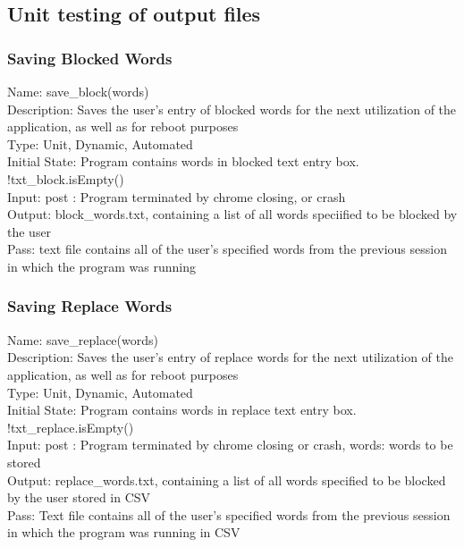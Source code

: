 \documentclass[12pt, titlepage]{article}
\begin{document}
\begin{enumerate}
		
\subsection{Unit testing of output files}
\subsubsection{Saving Blocked Words}
Name: save\_block(words) \\
Description: Saves the user's entry of blocked words for the next utilization of the application, as well as for reboot purposes \\
Type: Unit, Dynamic, Automated \\
Initial State: Program contains words in blocked text entry box. !txt\_block.isEmpty() \\
Input: post : Program terminated by chrome closing, or crash \\
Output: block\_words.txt, containing a list of all words speciified to be blocked by the user \\
Pass: text file contains all of the user's specified words from the previous session in which the program was running \\

\subsubsection{Saving Replace Words}
Name: save\_replace(words) \\
Description: Saves the user's entry of replace words for the next utilization of the application, as well as for reboot purposes \\
Type: Unit, Dynamic, Automated \\
Initial State: Program contains words in replace text entry box. !txt\_replace.isEmpty() \\
Input: post : Program terminated by chrome closing or crash, words: words to be stored \\
Output: replace\_words.txt, containing a list of all words specified to be blocked by the user stored in CSV \\
Pass: Text file contains all of the user's specified words from the previous session in which the program was running in CSV\\


\end{enumerate}
\end{document}
